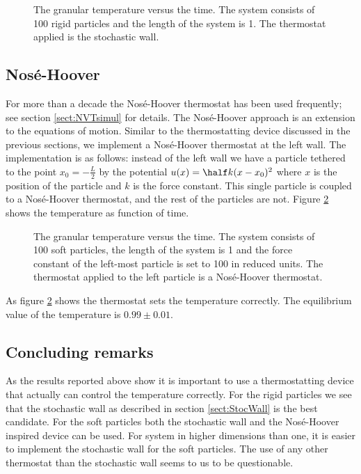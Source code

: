 \begin{figure}
  \begin{center}
  \end{center}
  \caption[The stochastic wall]{The granular temperature versus the
    time. The system 
    consists of 100 rigid particles and the length of the system is
    1. The thermostat applied is the stochastic wall.\label{fig:StocWall}}  
\end{figure}


\subsection{Nos\'{e}-Hoover}
\label{sect:NHwall}
For more than a decade the Nos\'{e}-Hoover thermostat has been used
frequently; see section \ref{sect:NVTsimul} for details. The
Nos\'{e}-Hoover approach is an extension to the equations of
motion. Similar to the thermostatting device discussed in the
previous sections, we implement a Nos{\'{e}}-Hoover thermostat at the
left wall. The implementation is as follows: instead of the left wall
we have a particle tethered to the point $x_0=-\frac{L}{2}$ by the
potential $u(x) = \half k (x-x_0)^2$ where $x$ is the position of the
particle and $k$ is the force constant. This single particle is
coupled to a Nos\'{e}-Hoover thermostat, and the rest of the particles
are not. Figure \ref{fig:NHwall} shows the temperature as function of
time. 

\begin{figure}
  \begin{center}
  \end{center}
  \caption[The Nos\'{e}-Hoover wall]{The granular temperature versus
    the time. The system 
    consists of 100 soft particles, the length of the system is
    1 and the force constant of the left-most particle is set to 100
    in reduced units. The thermostat applied to the left particle is a
    Nos\'{e}-Hoover thermostat.\label{fig:NHwall}}  
\end{figure}

As figure \ref{fig:NHwall} shows the thermostat sets the temperature
correctly. The equilibrium value of the temperature is $0.99 \pm
0.01$. 

\subsection{Concluding remarks}
As the results reported above show it is important to use a
thermostatting device that actually can control the temperature
correctly. For the rigid particles we see that the stochastic wall as
described in section \ref{sect:StocWall} is the best candidate. For
the soft particles both the stochastic wall and the Nos\'{e}-Hoover
inspired device can be used. For system in higher dimensions than one,
it is easier to implement the stochastic wall for the soft particles.
The use of any other thermostat than the stochastic wall seems to us
to be questionable.

